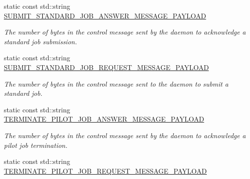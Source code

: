 \begin{DoxyCompactItemize}
\mbox{\label{classwrench_1_1_compute_service_message_payload_a1c23509b24aee6ea4e71b28497d659ba}} 
static const std\+::string \hyperlink{classwrench_1_1_compute_service_message_payload_a1c23509b24aee6ea4e71b28497d659ba}{S\+U\+B\+M\+I\+T\+\_\+\+S\+T\+A\+N\+D\+A\+R\+D\+\_\+\+J\+O\+B\+\_\+\+A\+N\+S\+W\+E\+R\+\_\+\+M\+E\+S\+S\+A\+G\+E\+\_\+\+P\+A\+Y\+L\+O\+AD}
\begin{DoxyCompactList}\small\item\em The number of bytes in the control message sent by the daemon to acknowledge a standard job submission. \end{DoxyCompactList}\item 
\mbox{\label{classwrench_1_1_compute_service_message_payload_a86cb39a4741f03121d6c8254d8cbaf1c}} 
static const std\+::string \hyperlink{classwrench_1_1_compute_service_message_payload_a86cb39a4741f03121d6c8254d8cbaf1c}{S\+U\+B\+M\+I\+T\+\_\+\+S\+T\+A\+N\+D\+A\+R\+D\+\_\+\+J\+O\+B\+\_\+\+R\+E\+Q\+U\+E\+S\+T\+\_\+\+M\+E\+S\+S\+A\+G\+E\+\_\+\+P\+A\+Y\+L\+O\+AD}
\begin{DoxyCompactList}\small\item\em The number of bytes in the control message sent to the daemon to submit a standard job. \end{DoxyCompactList}\item 
\mbox{\label{classwrench_1_1_compute_service_message_payload_ad0bf94135d0c642785f4ce490a0dde0b}} 
static const std\+::string \hyperlink{classwrench_1_1_compute_service_message_payload_ad0bf94135d0c642785f4ce490a0dde0b}{T\+E\+R\+M\+I\+N\+A\+T\+E\+\_\+\+P\+I\+L\+O\+T\+\_\+\+J\+O\+B\+\_\+\+A\+N\+S\+W\+E\+R\+\_\+\+M\+E\+S\+S\+A\+G\+E\+\_\+\+P\+A\+Y\+L\+O\+AD}
\begin{DoxyCompactList}\small\item\em The number of bytes in the control message sent by the daemon to acknowledge a pilot job termination. \end{DoxyCompactList}\item 
\mbox{\label{classwrench_1_1_compute_service_message_payload_a6d80bf772eba3b8eb7224dc73e370cd0}} 
static const std\+::string \hyperlink{classwrench_1_1_compute_service_message_payload_a6d80bf772eba3b8eb7224dc73e370cd0}{T\+E\+R\+M\+I\+N\+A\+T\+E\+\_\+\+P\+I\+L\+O\+T\+\_\+\+J\+O\+B\+\_\+\+R\+E\+Q\+U\+E\+S\+T\+\_\+\+M\+E\+S\+S\+A\+G\+E\+\_\+\+P\+A\+Y\+L\+O\+AD}

\end{DoxyCompactItemize}
